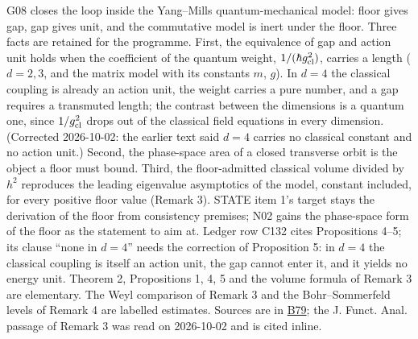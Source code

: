\documentclass[11pt,a4paper]{article}
\begin{document}
G08 closes the loop inside the Yang--Mills quantum-mechanical model:
floor gives gap, gap gives unit, and the commutative model is inert
under the floor. Three facts are retained for the programme. First, the
equivalence of gap and action unit holds when the coefficient of the
quantum weight, \(1/(\hbar g_{\rm cl}^2)\), carries a length (\(d=2,3\),
and the matrix model with its constants \(m\), \(g\)). In \(d=4\) the
classical coupling is already an action unit, the weight carries a pure
number, and a gap requires a transmuted length; the contrast between the
dimensions is a quantum one, since \(1/g_{\rm cl}^2\) drops out of the
classical field equations in every dimension. (Corrected 2026-10-02: the
earlier text said \(d=4\) carries no classical constant and no action
unit.) Second, the phase-space area of a closed transverse orbit is the
object a floor must bound. Third, the floor-admitted classical volume
divided by \(h^2\) reproduces the leading eigenvalue asymptotics of the
model, constant included, for every positive floor value (Remark 3).
STATE item 1's target stays the derivation of the floor from consistency
premises; N02 gains the phase-space form of the floor as the statement
to aim at. Ledger row C132 cites Propositions 4--5; its clause ``none in
\(d=4\)'' needs the correction of Proposition 5: in \(d=4\) the
classical coupling is itself an action unit, the gap cannot enter it,
and it yields no energy unit. Theorem 2, Propositions 1, 4, 5 and the
volume formula of Remark 3 are elementary. The Weyl comparison of Remark
3 and the Bohr--Sommerfeld levels of Remark 4 are labelled estimates.
Sources are in \href{../references/batches/B79.md}{B79}; the J. Funct.
Anal. passage of Remark 3 was read on 2026-10-02 and is cited inline.
\end{document}

